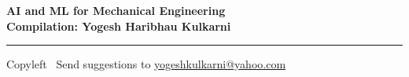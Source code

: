 % 



% 


\graphicspath{{images/}}



\footnotesize


\begin{center}
\Large{\textbf{AI and ML for Mechanical Engineering\\ Compilation: Yogesh Haribhau Kulkarni}}  
\end{center}


\begin{multicols}{3}
	
\end{multicols}

\rule{\linewidth}{0.25pt}
\scriptsize
Copyleft \textcopyleft\  Send suggestions to 
\href{http://www.yogeshkulkarni.com}{yogeshkulkarni@yahoo.com}


